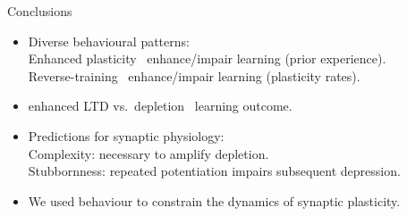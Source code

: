 \documentclass{beamer}%
\begin{document}
\begin{frame}{Conclusions}
%
 \begin{itemize}
   \item Diverse behavioural patterns:\\
   \alert{Enhanced plasticity \lto\ enhance/impair} learning (prior experience).\\
   \alert{Reverse-training \lto\ enhance/impair} learning (plasticity rates).

   \item \alert{enhanced LTD} vs.\ \alert{depletion} \lto\ learning outcome.
    \hfill{} {}



   \item Predictions for synaptic physiology:\\
   \alert{Complexity:} necessary to amplify depletion.\\
   \alert{Stubbornness:} repeated potentiation impairs subsequent depression.

   \vp\item  We used behaviour to constrain the dynamics of synaptic plasticity.
\end{itemize}
%
\end{frame}
\end{document}
